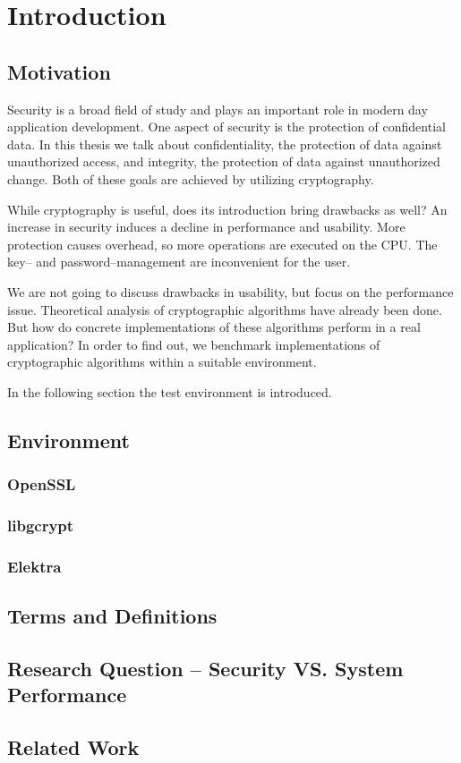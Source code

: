 \chapter{Introduction}

\section{Motivation}

Security is a broad field of study and plays an important role in modern day application development.
One aspect of security is the protection of confidential data.
In this thesis we talk about confidentiality, the protection of data against unauthorized access, and integrity, the protection of data against unauthorized change.
Both of these goals are achieved by utilizing cryptography.

While cryptography is useful, does its introduction bring drawbacks as well?
An increase in security induces a decline in performance and usability.
More protection causes overhead, so more operations are executed on the CPU.
The key-- and password--management are inconvenient for the user.

We are not going to discuss drawbacks in usability, but focus on the performance issue.
Theoretical analysis of cryptographic algorithms have already been done. 
But how do concrete implementations of these algorithms perform in a real application?
In order to find out, we benchmark implementations of cryptographic algorithms within a suitable environment.

In the following section the test environment is introduced.

\section{Environment}

	\subsection{OpenSSL}

	\subsection{libgcrypt}

	\subsection{Elektra}

\section{Terms and Definitions}

\section{Research Question -- Security VS. System Performance}

\section{Related Work}